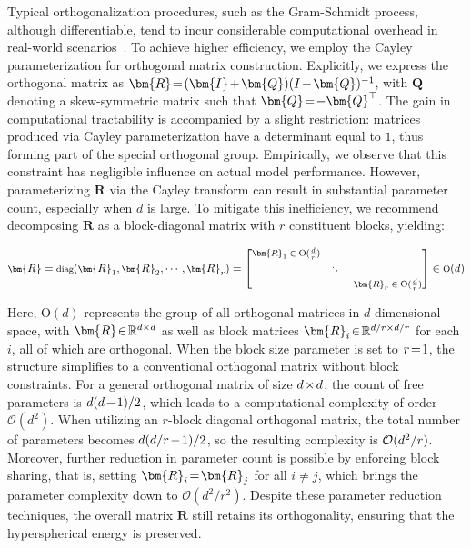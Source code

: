 Typical orthogonalization procedures, such as the Gram-Schmidt process, although differentiable, tend to incur considerable computational overhead in real-world scenarios~\cite{liu2021orthogonal}. To achieve higher efficiency, we employ the Cayley parameterization for orthogonal matrix construction. Explicitly, we express the orthogonal matrix as $\thickmuskip=2mu \medmuskip=2mu \bm{R}=(\bm{I}+\bm{Q})(I-\bm{Q})^{-1}$, with $\bm{Q}$ denoting a skew-symmetric matrix such that $\thickmuskip=2mu \medmuskip=2mu \bm{Q}=-\bm{Q}^\top$. The gain in computational tractability is accompanied by a slight restriction: matrices produced via Cayley parameterization have a determinant equal to $1$, thus forming part of the special orthogonal group. Empirically, we observe that this constraint has negligible influence on actual model performance. However, parameterizing $\bm{R}$ via the Cayley transform can result in substantial parameter count, especially when $d$ is large. To mitigate this inefficiency, we recommend decomposing $\bm{R}$ as a block-diagonal matrix with $r$ constituent blocks, yielding:

\begin{equation}
    \footnotesize
    \bm{R}=\text{diag}(\bm{R}_1,\bm{R}_2,\cdots,\bm{R}_r)=\begin{bmatrix}
    \bm{R}_1\in \text{O}(\frac{d}{r}) &  &\\
    &\ddots & \\
    & & \bm{R}_r\in \text{O}(\frac{d}{r})
    \end{bmatrix}\in \text{O}(d)
\end{equation}

Here, $\text{O}(d)$ represents the group of all orthogonal matrices in $d$-dimensional space, with $\thickmuskip=2mu \medmuskip=2mu \bm{R}\in\mathbb{R}^{d\times d}$ as well as block matrices $\thickmuskip=2mu \medmuskip=2mu \bm{R}_i\in\mathbb{R}^{d/r\times d/r}$ for each $i$, all of which are orthogonal. When the block size parameter is set to $\thickmuskip=2mu \medmuskip=2mu r=1$, the structure simplifies to a conventional orthogonal matrix without block constraints. For a general orthogonal matrix of size $\thickmuskip=2mu \medmuskip=2mu d\times d$, the count of free parameters is $\thickmuskip=2mu \medmuskip=2mu d(d-1)/2$, which leads to a computational complexity of order $\mathcal{O}(d^2)$. When utilizing an $r$-block diagonal orthogonal matrix, the total number of parameters becomes $\thickmuskip=2mu \medmuskip=2mu d(d/r-1)/2$, so the resulting complexity is $\thickmuskip=2mu \medmuskip=2mu \mathcal{O}(d^2/r)$. Moreover, further reduction in parameter count is possible by enforcing block sharing, that is, setting $\thickmuskip=2mu \medmuskip=2mu\bm{R}_i=\bm{R}_j$ for all $i\neq j$, which brings the parameter complexity down to $\mathcal{O}(d^2/r^2)$. Despite these parameter reduction techniques, the overall matrix $\bm{R}$ still retains its orthogonality, ensuring that the hyperspherical energy is preserved.

